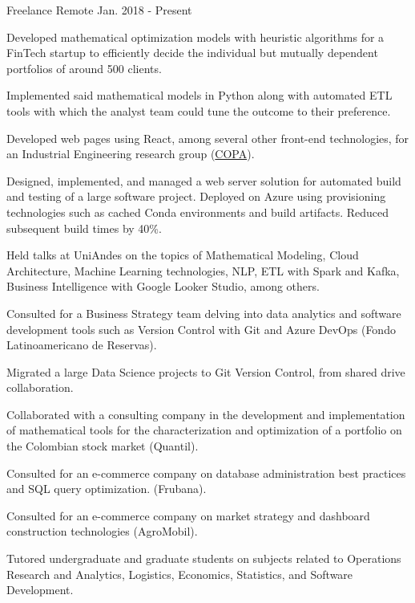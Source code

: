 

\begin{cventries}

	{Freelance} %
	{Remote} %
	{Jan. 2018 {-} Present} %
	{
		\begin{cvitems} %
			\item {Developed mathematical optimization models with heuristic algorithms for a FinTech startup to efficiently decide the individual but mutually dependent portfolios of around 500 clients.}
			\item {Implemented said mathematical models in Python along with automated ETL tools with which the analyst team could tune the outcome to their preference.}
			\item {Developed  web pages using React, among several other front-end technologies, for an Industrial Engineering research group (\href{https://copa.uniandes.edu.co/en/}{COPA}).}
			\item {Designed, implemented, and managed a web server solution for automated build and testing of a large software project. Deployed on Azure using provisioning technologies such as cached Conda environments and build artifacts. Reduced subsequent build times by 40\%.}
			\item {Held talks at UniAndes on the topics of Mathematical Modeling, Cloud Architecture, Machine Learning technologies, NLP, ETL with Spark and Kafka, Business Intelligence with Google Looker Studio, among others.}
			\item {Consulted for a Business Strategy team delving into data analytics and software development tools such as Version Control with Git and Azure DevOps (Fondo Latinoamericano de Reservas).}
			\item {Migrated a large Data Science projects to Git Version Control, from shared drive collaboration.}
			\item {Collaborated with a consulting company in the development and implementation of mathematical tools for the characterization and optimization of a portfolio on the Colombian stock market (Quantil).}
			\item {Consulted for an e-commerce company on database administration best practices and SQL query optimization. (Frubana).}
			\item {Consulted for an e-commerce company on market strategy and dashboard construction technologies (AgroMobil).}
			\item {Tutored undergraduate and graduate students on subjects related to Operations Research and Analytics, Logistics, Economics, Statistics, and Software Development.}
		\end{cvitems}
	}


\end{cventries}
